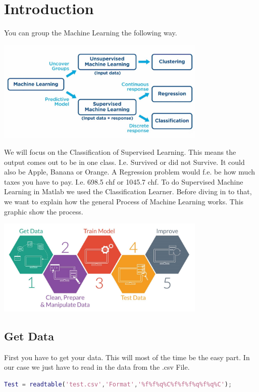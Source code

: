 \documentclass[
   10.5pt,
   invert-title=true,
   titlepage=false,
   titleimage-ratio=13,
   class=article
]{bfhpub}				%
\begin{document}
\section*{Introduction}
You can group the Machine Learning the following way.
\begin{center}
	\includegraphics[width=100mm]{overview}
\end{center}

We will focus on the Classification of Supervised Learning. This means the output comes out to be in one class. I.e. Survived or did not Survive. It could also be Apple, Banana or Orange. A Regression problem would f.e. be how much taxes you have to pay. I.e. 698.5 chf or 1045.7 chf. To do Supervised Machine Learning in Matlab we used the Classification Learner. Before diving in to that, we want to explain how the general Process of Machine Learning works. This graphic show the process.
\begin{center}
	\includegraphics[width=100mm]{process}
\end{center}

\subsection*{Get Data}
First you have to get your data. This will most of the time be the easy part. In our case we just have to read in the data from the .csv File.
\begin{lstlisting}[language=Matlab]
Test = readtable('test.csv','Format','%f%f%q%C%f%f%f%q%f%q%C');
\end{lstlisting}
\end{document}
